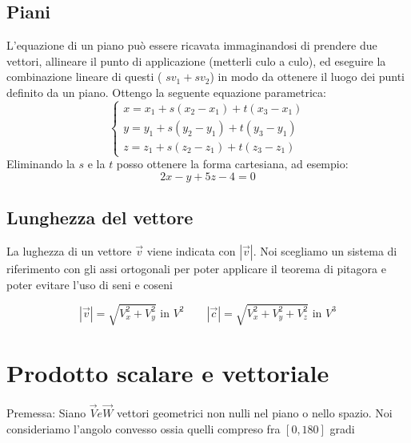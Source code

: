 \documentclass[12pt,a4paper,oneside]{article}
\begin{document}
\subsection{Piani}
L'equazione di un piano può essere ricavata immaginandosi di prendere due vettori, allineare il punto di applicazione (metterli culo a culo), ed eseguire la combinazione lineare di questi ( $sv_1 + sv_2$) in modo da ottenere il luogo dei punti definito da un piano. Ottengo la seguente equazione parametrica:
\[
	\begin{cases}
		x = x_1 + s\left( x_2 - x_1 \right) + t\left( x_3-x_1 \right) \\
		y = y_1 + s\left( y_2-y_1 \right) + t\left( y_3-y_1 \right)   \\
		z = z_1 + s\left( z_2-z_1 \right)  + t \left( z_3-z_1 \right)
	\end{cases}
\]
Eliminando la $s$ e la $t$ posso ottenere la forma cartesiana, ad esempio:
\[
	2x - y + 5z - 4 =0
\]

\subsection{Lunghezza del vettore}
\label{sec:lunghezzadelvettore}
La lughezza di un vettore $\vec{v}$ viene indicata con $\left|\vec{{v}} \right|$. Noi scegliamo un sistema di riferimento con gli assi ortogonali per poter applicare il teorema di pitagora e poter evitare l'uso di seni e coseni

\[
	\left|\vec{v}\right|=\sqrt{V_x^2 + V_y^2} \text{ in } V^2 \quad \quad \left|\vec{c}\right| = \sqrt{V_x ^2 + V_y ^2 + V_z ^2} \text{ in } V^3
\]
\section{Prodotto scalare e vettoriale}
Premessa:
Siano $\vec{V} e \vec{W}$ vettori geometrici non nulli nel piano o nello spazio. Noi consideriamo l'angolo convesso ossia quelli compreso fra $\left[ 0,180 \right] $ gradi
\end{document}

